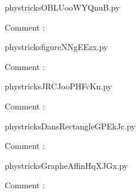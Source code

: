     \clearpage
    


    \newcommand{\CaptionFigOBLUooWYQnuB}{<+Type your caption here+>}
    \begin{center}
        
    \end{center}
    phystricksOBLUooWYQnuB.py

    Comment : 

    \clearpage
    


    \newcommand{\CaptionFigfigureNNgEEzx}{<+Type your caption here+>}
    \begin{center}
        
    \end{center}
    phystricksfigureNNgEEzx.py

    Comment : 

    \clearpage
    


    \newcommand{\CaptionFigJRCJooPHFcKn}{<+Type your caption here+>}
    \begin{center}
        
    \end{center}
    phystricksJRCJooPHFcKn.py

    Comment : 

    \clearpage
    


    \newcommand{\CaptionFigDansRectangleGPEkJc}{<+Type your caption here+>}
    \begin{center}
        
    \end{center}
    phystricksDansRectangleGPEkJc.py

    Comment : 

    \clearpage
    


    \newcommand{\CaptionFigGrapheAffinHqXJGx}{<+Type your caption here+>}
    \begin{center}
        
    \end{center}
    phystricksGrapheAffinHqXJGx.py

    Comment : 

    \clearpage
    

